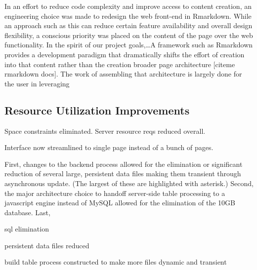 \documentclass[10pt]{report}
\begin{document}
In an effort to reduce code complexity and improve access to content creation, an engineering choice was made to redesign the web front-end in Rmarkdown. While an approach such as this can reduce certain feature availability and overall design flexibility, a conscious priority was placed on the content of the page over the web functionality. In the spirit of our project goals,\ldots A framework such as Rmarkdown provides a development paradigm that dramatically shifts the effort of creation into that content rather than the creation broader page architecture [citeme rmarkdown docs]. The work of assembling that architecture is largely done for the user in leveraging

\subsection{Resource Utilization Improvements}
Space constraints eliminated. Server resource reqs reduced overall.

Interface now streamlined to single page instead of a bunch of pages.

First, changes to the backend process allowed for the elimination or significant reduction of several large, persistent data files making them transient through asynchronous update. (The largest of these are highlighted with asterisk.) Second, the major architecture choice to handoff server-side table processing to a javascript engine instead of MySQL allowed for the elimination of the 10GB database. Last,

sql elimination

persistent data files reduced

build table process constructed to make more files dynamic and transient
\end{document}
